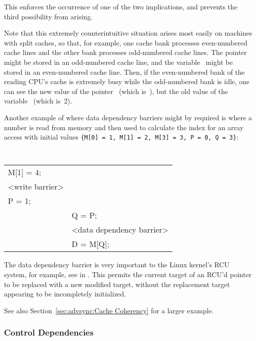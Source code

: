 This enforces the occurrence of one of the two implications, and prevents the
third possibility from arising.

Note that this extremely counterintuitive situation arises most easily on
machines with split caches, so that, for example, one cache bank processes
even-numbered cache lines and the other bank processes odd-numbered cache
lines.
The pointer~ might be stored in an odd-numbered cache line, and the
variable~ might be stored in an even-numbered cache line.  Then, if the
even-numbered bank of the reading CPU's cache is extremely busy while the
odd-numbered bank is idle, one can see the new value of the
pointer~ (which is~),
but the old value of the variable~ (which is~2).

Another example of where data dependency barriers might by required is where a
number is read from memory and then used to calculate the index for an array
access with initial values
{\tt \{M[0]~=~1, M[1]~=~2, M[3]~=~3, P~=~0, Q~=~3\}}:

\vspace{5pt}
\begin{minipage}[t]{\columnwidth}
\tt
\scriptsize
\begin{tabular}{l|p{1.5in}}
	\nf{CPU 1} &	\nf{CPU 2} \\
	\hline
	M[1] = 4; & \\
	<write barrier> & \\
	P = 1;	&	\\
		&	Q = P; \\
		&	<data dependency barrier> \\
		&	D = M[Q]; \\
\end{tabular}
\end{minipage}
\vspace{5pt}

The data dependency barrier is very important to the Linux kernel's
RCU system, for example,
see  in .
This permits the current
target of an RCU'd pointer to be replaced with a new modified target, without
the replacement target appearing to be incompletely initialized.

See also
Section~\ref{sec:advsync:Cache Coherency}
for a larger example.

\subsubsection{Control Dependencies}
\label{sec:advsync:Control Dependencies}

